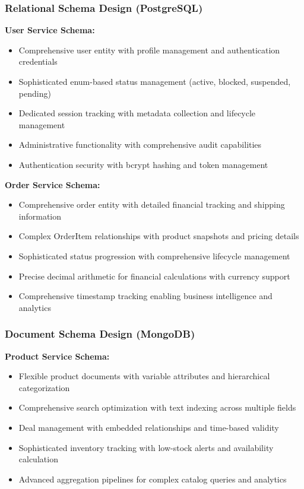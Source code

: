 \subsubsection{Relational Schema Design (PostgreSQL)}

\textbf{User Service Schema:}
\begin{itemize}
\item Comprehensive user entity with profile management and authentication credentials
\item Sophisticated enum-based status management (active, blocked, suspended, pending)
\item Dedicated session tracking with metadata collection and lifecycle management
\item Administrative functionality with comprehensive audit capabilities
\item Authentication security with bcrypt hashing and token management
\end{itemize}

\textbf{Order Service Schema:}
\begin{itemize}
\item Comprehensive order entity with detailed financial tracking and shipping information
\item Complex OrderItem relationships with product snapshots and pricing details
\item Sophisticated status progression with comprehensive lifecycle management
\item Precise decimal arithmetic for financial calculations with currency support
\item Comprehensive timestamp tracking enabling business intelligence and analytics
\end{itemize}

\subsubsection{Document Schema Design (MongoDB)}

\textbf{Product Service Schema:}
\begin{itemize}
\item Flexible product documents with variable attributes and hierarchical categorization
\item Comprehensive search optimization with text indexing across multiple fields
\item Deal management with embedded relationships and time-based validity
\item Sophisticated inventory tracking with low-stock alerts and availability calculation
\item Advanced aggregation pipelines for complex catalog queries and analytics
\end{itemize}

